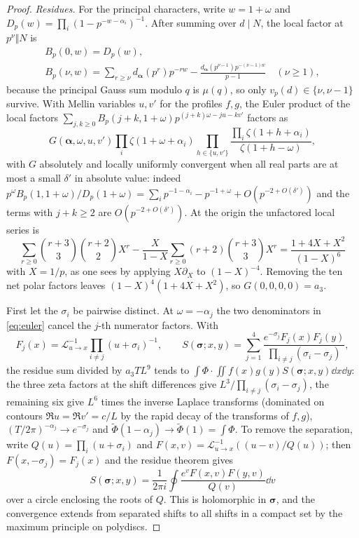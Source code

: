 \documentclass[11pt,colorlinks]{charlie}
\begin{document}
\begin{proof}
\emph{Residues.} For the principal characters, write $w=1+\omega$ and $D_p(w)=\prod_i(1-p^{-w-\alpha_i})^{-1}$. After summing over $d\mid N$, the local factor at $p^\nu\Vert N$ is
\begin{gather*}
 B_p(0,w)=D_p(w),\\ B_p(\nu,w)=\sum_{r\ge\nu}d_{\boldsymbol\alpha}(p^r)p^{-rw}-\frac{d_{\boldsymbol\alpha}(p^{\nu-1})p^{-(\nu-1)w}}{p-1}\quad(\nu\ge1),
\end{gather*}
because the principal Gauss sum modulo $q$ is $\mu(q)$, so only $v_p(d)\in\{\nu,\nu-1\}$ survive. With Mellin variables $u,v'$ for the profiles $f,g$, the Euler product of the local factors $\sum_{j,k\ge0}B_p(j+k,1+\omega)p^{(j+k)\omega-ju-kv'}$ factors as
\begin{equation}\label{eq:euler}
 G(\boldsymbol\alpha,\omega,u,v')\prod_i\zeta(1+\omega+\alpha_i)\prod_{h\in\{u,v'\}}\frac{\prod_i\zeta(1+h+\alpha_i)}{\zeta(1+h-\omega)},
\end{equation}
with $G$ absolutely and locally uniformly convergent when all real parts are at most a small $\delta'$ in absolute value: indeed $p^\omega B_p(1,1+\omega)/D_p(1+\omega)=\sum_ip^{-1-\alpha_i}-p^{-1+\omega}+O(p^{-2+O(\delta')})$ and the terms with $j+k\ge2$ are $O(p^{-2+O(\delta')})$. At the origin the unfactored local series is
\[
 \sum_{r\ge0}\binom{r+3}3\binom{r+2}2X^r-\frac X{1-X}\sum_{r\ge0}(r+2)\binom{r+3}3X^r=\frac{1+4X+X^2}{(1-X)^6}
\]
with $X=1/p$,
as one sees by applying $X\partial_X$ to $(1-X)^{-4}$. Removing the ten net polar factors leaves $(1-X)^4(1+4X+X^2)$, so $G(0,0,0,0)=a_3$.

First let the $\sigma_i$ be pairwise distinct. At $\omega=-\alpha_j$ the two denominators in \eqref{eq:euler} cancel the $j$-th numerator factors. With
\[
 F_j(x)=\mathcal L^{-1}_{u\to x}\prod_{i\ne j}(u+\sigma_i)^{-1},\qquad
 S(\boldsymbol\sigma;x,y)=\sum_{j=1}^4\frac{e^{-\sigma_j}F_j(x)F_j(y)}{\prod_{i\ne j}(\sigma_i-\sigma_j)},
\]
the residue sum divided by $a_3TL^9$ tends to $\int\Phi\cdot\iint f(x)g(y)S(\boldsymbol\sigma;x,y)\dd x\dd y$: the three zeta factors at the shift differences give $L^3/\prod_{i\ne j}(\sigma_i-\sigma_j)$, the remaining six give $L^6$ times the inverse Laplace transforms (dominated on contours $\Re u=\Re v'=c/L$ by the rapid decay of the transforms of $f,g$), $(T/2\pi)^{-\alpha_j}\to e^{-\sigma_j}$ and $\widetilde\Phi(1-\alpha_j)\to\widetilde\Phi(1)=\int\Phi$. To remove the separation, write $Q(u)=\prod_i(u+\sigma_i)$ and $F(x,v)=\mathcal L^{-1}_{u\to x}((u-v)/Q(u))$; then $F(x,-\sigma_j)=F_j(x)$ and the residue theorem gives
\[
 S(\boldsymbol\sigma;x,y)=\frac1{2\pi i}\oint\frac{e^vF(x,v)F(y,v)}{Q(v)}\dd v
\]
over a circle enclosing the roots of $Q$. This is holomorphic in $\boldsymbol\sigma$, and the convergence extends from separated shifts to all shifts in a compact set by the maximum principle on polydiscs.


\end{proof}
\end{document}
